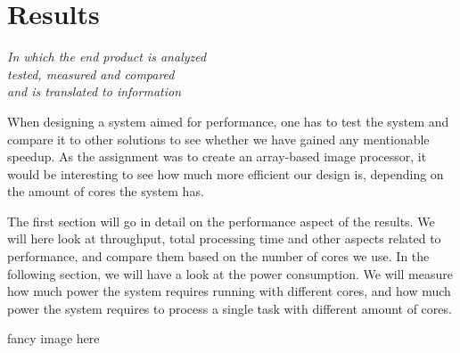 \chapter{Results}\label{ch:res}

\begin{flushright}{\slshape
    In which the end product is analyzed\\
    tested, measured and compared\\
    and is translated to information
}
\end{flushright}

When designing a system aimed for performance, one has to test the system and
compare it to other solutions to see whether we have gained any mentionable
speedup. As the assignment was to create an array-based image processor, it
would be interesting to see how much more efficient our design is, depending on
the amount of cores the system has.

The first section will go in detail on the performance aspect of the results. We
will here look at throughput, total processing time and other aspects related to
performance, and compare them based on the number of cores we use. In the
following section, we will have a look at the power consumption. We will measure
how much power the system requires running with different cores, and how much
power the system requires to process a single task with different amount of
cores.

{\sc fancy image here}




